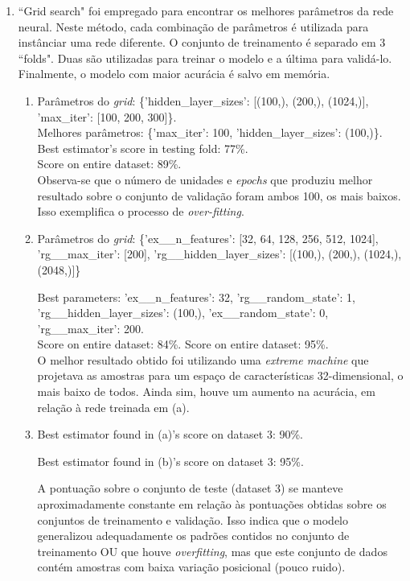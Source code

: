 \documentclass[12pt]{report}
\begin{document}
\begin{enumerate}
	\item ``Grid search" foi empregado para encontrar os melhores parâmetros da
	rede neural. Neste método, cada combinação de parâmetros é utilizada para
	instânciar uma rede diferente. O conjunto de treinamento é separado em 3
	``folds". Duas são utilizadas para treinar o modelo e a última para
	validá-lo. Finalmente, o modelo com maior acurácia é salvo em memória.

	\begin{enumerate}
		\item Parâmetros do \textit{grid}: \{'hidden\_layer\_sizes': [(100,),
		(200,), (1024,)], 'max\_iter': [100, 200, 300]\}.\\
		Melhores parâmetros: \{'max\_iter': 100, 'hidden\_layer\_sizes':
		(100,)\}.\\
		
		Best estimator's score in testing fold: 77\%.\\
		Score on entire dataset: 89\%.\\
		
		Observa-se que o número de unidades e \textit{epochs} que produziu
		melhor resultado sobre o conjunto de validação foram ambos 100, os mais
		baixos. Isso exemplifica o processo de \textit{over-fitting}.

		\item Parâmetros do \textit{grid}: \{'ex\_\_n\_features': [32, 64, 128,
		256, 512, 1024], 'rg\_\_max\_iter': [200],
		'rg\_\_hidden\_layer\_sizes': [(100,), (200,), (1024,), (2048,)]\}
		
		Best parameters: {'ex\_\_n\_features': 32, 'rg\_\_random\_state': 1,
		'rg\_\_hidden\_layer\_sizes': (100,), 'ex\_\_random\_state': 0,
		'rg\_\_max\_iter': 200}.\\
		
		Score on entire dataset: 84\%. Score on entire dataset: 95\%.\\
		
		O melhor resultado obtido foi utilizando uma \textit{extreme machine}
		que projetava as amostras para um espaço de características
		32-dimensional, o mais baixo de todos. Ainda sim, houve um aumento na
		acurácia, em relação à rede treinada em (a).
		
		\item Best estimator found in (a)'s score on dataset 3: 90\%.
		
			  Best estimator found in (b)'s score on dataset 3: 95\%.
			  
			  A pontuação sobre o conjunto de teste (dataset 3) se manteve
			  aproximadamente constante em relação às pontuações obtidas sobre
			  os conjuntos de treinamento e validação. Isso indica que o modelo
			  generalizou adequadamente os padrões contidos no conjunto de
			  treinamento OU que houve \textit{overfitting}, mas que este
			  conjunto de dados contém amostras com baixa variação posicional
			  (pouco ruido).
	\end{enumerate}


\end{enumerate}
\end{document}
